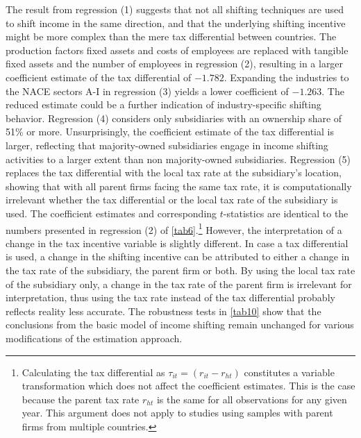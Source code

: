 \documentclass[10pt,twocolumn,oneside,cmyk]{article}
\begin{document}
The result from regression (1) suggests that not all shifting techniques are used to shift income in the same direction, and that the underlying shifting incentive might be more complex than the mere tax differential between countries. The production factors fixed assets and costs of employees are replaced with tangible fixed assets and the number of employees in regression (2), resulting in a larger coefficient estimate of the tax differential of $-1.782$. Expanding the industries to the NACE sectors A-I in regression (3) yields a lower coefficient of $-1.263$. The reduced estimate could be a further indication of industry-specific shifting behavior. Regression (4) considers only subsidiaries with an ownership share of 51\% or more. Unsurprisingly, the coefficient estimate of the tax differential is larger, reflecting that majority-owned subsidiaries engage in income shifting activities to a larger extent than non majority-owned subsidiaries. Regression (5) replaces the tax differential with the local tax rate at the subsidiary's location, showing that with all parent firms facing the same tax rate, it is computationally irrelevant whether the tax differential or the local tax rate of the subsidiary is used. The coefficient estimates and corresponding $t$-statistics are identical to the numbers presented in regression (2) of \cref{tab6}.\footnote{Calculating the tax differential as $\tau_{it}=(r_{it}-r_{ht})$ constitutes a variable transformation which does not affect the coefficient estimates. This is the case because the parent tax rate $r_{ht}$ is the same for all observations for any given year. This argument does not apply to studies using samples with parent firms from multiple countries.} However, the interpretation of a change in the tax incentive variable is slightly different. In case a tax differential is used, a change in the shifting incentive can be attributed to either a change in the tax rate of the subsidiary, the parent firm or both. By using the local tax rate of the subsidiary only, a change in the tax rate of the parent firm is irrelevant for interpretation, thus using the tax rate instead of the tax differential probably reflects reality less accurate. The robustness tests in \cref{tab10} show that the conclusions from the basic model of income shifting remain unchanged for various modifications of the estimation approach.
\end{document}
